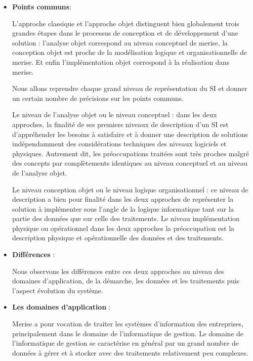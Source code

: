 \vspace{1em}
\begin{itemize}
	\setlength\itemsep{1em}
	\item \textbf{Points communs}:

	      L’approche classique et l’approche objet distinguent bien globalement trois grandes étapes dans le processus de conception et de développement d’une solution : l’analyse objet correspond au niveau conceptuel de merise, la conception objet est proche de la modélisation logique et organisationnelle de merise. 
		  Et enfin l’implémentation objet correspond à la réalisation dans merise.

	      Nous allons reprendre chaque grand niveau de représentation du SI et donner un certain nombre
	      de précisions sur les points communs.

	      Le niveau de l’analyse objet ou le niveau conceptuel : dans les deux approches, la finalité de ses premiers niveaux de description d’un SI est d’appréhender les besoins à satisfaire et à donner une description de solutions indépendamment des considérations techniques des niveaux logiciels et physiques. Autrement dit, les préoccupations traitées sont très proches malgré des concepts par complètements identiques au niveau conceptuel et au niveau de l’analyse objet.

	      Le niveau conception objet ou le niveau logique organisationnel : ce niveau de description a bien pour finalité dans les deux approches de représenter la solution à implémenter sous l’angle de la logique informatique tant sur la partie des données que sur celle des traitements. Le niveau implémentation physique ou opérationnel dans les deux approches la préoccupation est la description physique et opérationnelle des données et des traitements.

	\item \textbf{Différences} :

	      Nous observons les différences entre ces deux approches au niveau des domaines d’application,
	      de la démarche, les données et les traitements puis l’aspect évolution du système.

	\item \textbf{Les domaines d’application} :

	      Merise a pour vocation de traiter les systèmes d’information des entreprises, principalement dans le domaine de l’informatique de gestion. Le domaine de l’informatique de gestion se caractérise en général par un grand nombre de données à gérer et à stocker avec des traitements relativement peu complexes.


\end{itemize}
